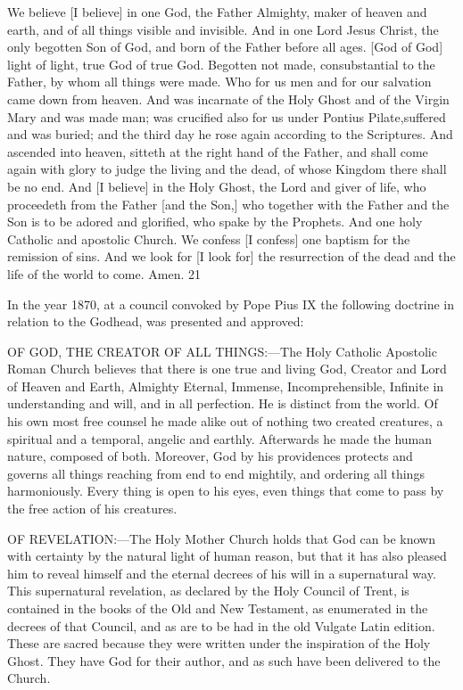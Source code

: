 We believe [I believe] in one God, the Father Almighty, maker of heaven and earth, and of
all things visible and invisible. And in one Lord Jesus Christ, the only begotten Son of God,
and born of the Father before all ages. [God of God] light of light, true God of true God.
Begotten not made, consubstantial to the Father, by whom all things were made. Who for us
men and for our salvation came down from heaven. And was incarnate of the Holy Ghost and
of the Virgin Mary and was made man; was crucified also for us under Pontius Pilate,suffered and was buried; and the third day he rose again according to the Scriptures. And
ascended into heaven, sitteth at the right hand of the Father, and shall come again with glory
to judge the living and the dead, of whose Kingdom there shall be no end. And [I believe] in
the Holy Ghost, the Lord and giver of life, who proceedeth from the Father [and the Son,]
who together with the Father and the Son is to be adored and glorified, who spake by the
Prophets. And one holy Catholic and apostolic Church. We confess [I confess] one baptism
for the remission of sins. And we look for [I look for] the resurrection of the dead and the life
of the world to come. Amen. 21

In the year 1870, at a council convoked by Pope Pius IX the following doctrine in relation to
the Godhead, was presented and approved:

OF GOD, THE CREATOR OF ALL THINGS:—The Holy Catholic Apostolic Roman
Church believes that there is one true and living God, Creator and Lord of Heaven and Earth,
Almighty Eternal, Immense, Incomprehensible, Infinite in understanding and will, and in all
perfection. He is distinct from the world. Of his own most free counsel he made alike out of
nothing two created creatures, a spiritual and a temporal, angelic and earthly. Afterwards he
made the human nature, composed of both. Moreover, God by his providences protects and
governs all things reaching from end to end mightily, and ordering all things harmoniously.
Every thing is open to his eyes, even things that come to pass by the free action of his
creatures.

OF REVELATION:—The Holy Mother Church holds that God can be known with certainty
by the natural light of human reason, but that it has also pleased him to reveal himself and the
eternal decrees of his will in a supernatural way. This supernatural revelation, as declared by
the Holy Council of Trent, is contained in the books of the Old and New Testament, as
enumerated in the decrees of that Council, and as are to be had in the old Vulgate Latin
edition. These are sacred because they were written under the inspiration of the Holy Ghost.
They have God for their author, and as such have been delivered to the Church.

